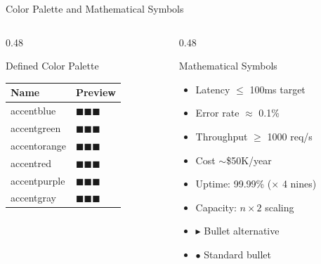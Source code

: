 \begin{frame}{\fontsize{11}{13}\selectfont Color Palette and Mathematical Symbols}
  \begin{columns}[T]
    \begin{column}{0.48\textwidth}
      \begin{block}{\scriptsize Defined Color Palette}
        \scriptsize
        \begin{tabular}{|l|l|}
          \hline
          \textbf{Name} & \textbf{Preview} \\
          \hline
          accentblue & \textcolor{accentblue}{$\blacksquare\blacksquare\blacksquare$} \\
          \hline
          accentgreen & \textcolor{accentgreen}{$\blacksquare\blacksquare\blacksquare$} \\
          \hline
          accentorange & \textcolor{accentorange}{$\blacksquare\blacksquare\blacksquare$} \\
          \hline
          accentred & \textcolor{accentred}{$\blacksquare\blacksquare\blacksquare$} \\
          \hline
          accentpurple & \textcolor{accentpurple}{$\blacksquare\blacksquare\blacksquare$} \\
          \hline
          accentgray & \textcolor{accentgray}{$\blacksquare\blacksquare\blacksquare$} \\
          \hline
        \end{tabular}
      \end{block}
    \end{column}
    \begin{column}{0.48\textwidth}
      \begin{block}{\scriptsize Mathematical Symbols}
        \scriptsize
        \begin{itemize}
          \setlength{\itemsep}{2pt}
          \item Latency $\leq$ 100ms target
          \item Error rate $\approx$ 0.1\%
          \item Throughput $\geq$ 1000 req/s
          \item Cost $\sim$\$50K/year
          \item Uptime: 99.99\% ($\times$ 4 nines)
          \item Capacity: $n \times 2$ scaling
          \item $\blacktriangleright$ Bullet alternative
          \item $\bullet$ Standard bullet
        \end{itemize}
      \end{block}
    \end{column}
  \end{columns}
\end{frame}
